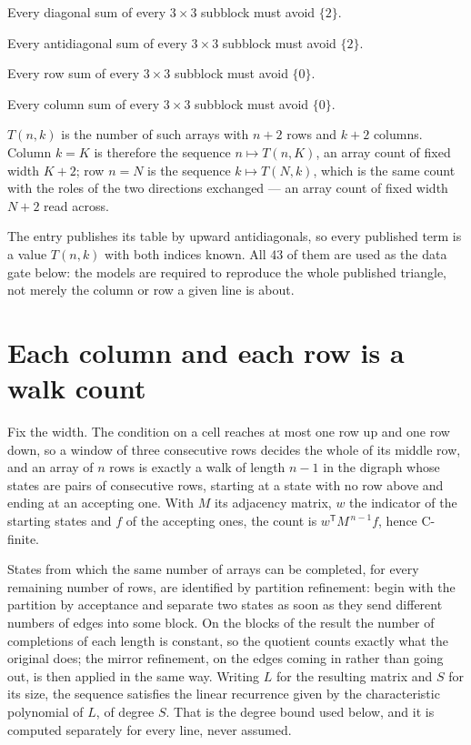 \documentclass[11pt]{article}
\theoremstyle{definition}
\begin{document}
Every diagonal sum of every $3\times3$ subblock must avoid $\{2\}$.

Every antidiagonal sum of every $3\times3$ subblock must avoid $\{2\}$.

Every row sum of every $3\times3$ subblock must avoid $\{0\}$.

Every column sum of every $3\times3$ subblock must avoid $\{0\}$.

$T(n,k)$ is the number of such arrays with $n + 2$ rows and $k + 2$ columns. Column $k = K$ is therefore the sequence $n \mapsto T(n,K)$, an array count of fixed width $K + 2$; row $n = N$ is the sequence $k \mapsto T(N,k)$, which is the same count with the roles of the two directions exchanged --- an array count of fixed width $N + 2$ read across.

The entry publishes its table by upward antidiagonals, so every published term is a value $T(n,k)$ with both indices known. All 43 of them are used as the data gate below: the models are required to reproduce the whole published triangle, not merely the column or row a given line is about.

\section{Each column and each row is a walk count}

Fix the width. The condition on a cell reaches at most one row up and one row down, so a window of three consecutive rows decides the whole of its middle row, and an array of $n$ rows is exactly a walk of length $n-1$ in the digraph whose states are pairs of consecutive rows, starting at a state with no row above and ending at an accepting one. With $M$ its adjacency matrix, $w$ the indicator of the starting states and $f$ of the accepting ones, the count is $w^{\mathsf T}M^{\,n-1}f$, hence C-finite.

States from which the same number of arrays can be completed, for every remaining number of rows, are identified by partition refinement: begin with the partition by acceptance and separate two states as soon as they send different numbers of edges into some block. On the blocks of the result the number of completions of each length is constant, so the quotient counts exactly what the original does; the mirror refinement, on the edges coming in rather than going out, is then applied in the same way. Writing $L$ for the resulting matrix and $S$ for its size, the sequence satisfies the linear recurrence given by the characteristic polynomial of $L$, of degree $S$. That is the degree bound used below, and it is computed separately for every line, never assumed.
\end{document}
